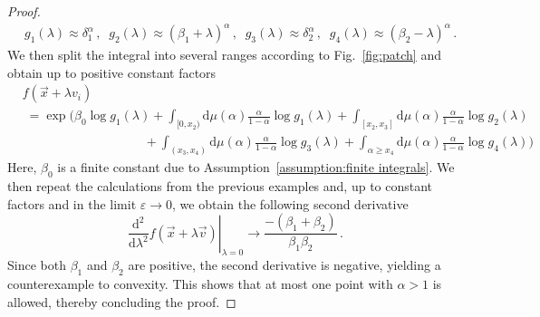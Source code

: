 \documentclass[aps,pra,11pt,onecolumn,nofootinbib,tightenlines]{revtex4-2}
\theoremstyle{definition}
\def \d {\mathrm{d}}
\begin{document}
\begin{proof}
\begin{align}
    &g_1(\lambda) \approx \delta_1^\alpha \,,\;\;g_2(\lambda) \approx (\beta_1+\lambda)^\alpha  \,,\;\;g_3(\lambda) \approx \delta_2^\alpha  \,,\;\;g_4(\lambda) \approx (\beta_2-\lambda)^\alpha  \,.
\end{align}
We then split the integral into several ranges according to Fig.~\ref{fig:patch} and obtain up to positive constant factors
\begin{align}
    &f(\vec{x} + \lambda v_i) \\
    &\; = \exp\Bigg(\beta_0 \log{g_1(\lambda)}+\int_{[0,x_2)}\d \mu(\alpha)\frac{\alpha}{1-\alpha}\log{g_1(\lambda)}+ \int_{[x_2,x_3]}\d \mu(\alpha)\frac{\alpha}{1-\alpha}\log{g_2(\lambda)}\\
    &\qquad \qquad \qquad \qquad \quad \;\;+ \int_{ (x_3,x_4)}\d \mu(\alpha)\frac{\alpha}{1-\alpha}\log{g_3(\lambda)} + \int_{\alpha \geq x_4 }\d \mu(\alpha)\frac{\alpha}{1-\alpha}\log{g_4(\lambda)}\Bigg)
\end{align}
Here, $\beta_0$ is a finite constant due to Assumption~\ref{assumption:finite integrals}.
We then repeat the calculations from the previous examples and, up to constant factors and in the limit $\varepsilon \to 0$, we obtain the following second derivative
\begin{equation}
    \left.\frac{\d^2 }{\d\lambda^2}f(\vec{x}+\lambda\vec{v})\right\vert_{\lambda=0} \rightarrow \frac{-(\beta_1+\beta_2)}{\beta_1\beta_2} \,.
\end{equation}
Since both $\beta_1$ and $\beta_2$ are positive, the second derivative is negative, yielding a counterexample to convexity.
This shows that at most one point with $\alpha > 1$ is allowed, thereby concluding the proof.
\end{proof}
\end{document}
